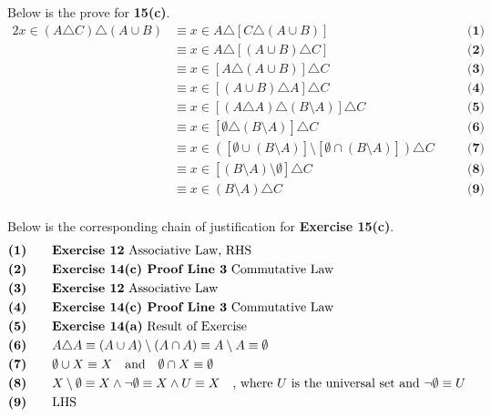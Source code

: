 Below is the prove for  \textbf{15(c)}.
\begin{alignat*}{2}
x \in (A \triangle C) \triangle (A \cup B) &\equiv x \in A \triangle [C \triangle (A \cup B)] && \quad \textbf{(1)}\\
&\equiv x \in A \triangle [(A \cup B) \triangle C] && \quad \textbf{(2)}\\
&\equiv x \in [A \triangle (A \cup B)] \triangle C && \quad \textbf{(3)}\\
&\equiv x \in [(A \cup B) \triangle A] \triangle C && \quad \textbf{(4)}\\
&\equiv x \in [(A \triangle A) \triangle (B \setminus A)] \triangle C && \quad \textbf{(5)}\\
&\equiv x \in [\emptyset \triangle (B \setminus A)] \triangle C && \quad \textbf{(6)}\\
&\equiv x \in ([\emptyset \cup (B \setminus A)] \setminus [\emptyset \cap (B \setminus A)] ) \triangle C && \quad \textbf{(7)}\\
&\equiv x \in [(B \setminus A) \setminus \emptyset] \triangle C && \quad \textbf{(8)}\\
&\equiv x \in (B \setminus A) \triangle C && \quad \textbf{(9)}\\
\end{alignat*}

Below is the corresponding chain of justification for \textbf{Exercise 15(c)}.
\begin{alignat*}{2}
&\textbf{(1)} && \quad \text{\textbf{Exercise 12} Associative Law, RHS}\\
&\textbf{(2)} && \quad \text{\textbf{Exercise 14(c) Proof Line 3} Commutative Law}\\
&\textbf{(3)} && \quad \text{\textbf{Exercise 12} Associative Law}\\
&\textbf{(4)} && \quad \text{\textbf{Exercise 14(c) Proof Line 3} Commutative Law}\\
&\textbf{(5)} && \quad \text{\textbf{Exercise 14(a)} Result of Exercise}\\
&\textbf{(6)} && \quad A \triangle A \equiv (A \cup A) \setminus (A \cap A) \equiv A \setminus A \equiv \emptyset\\
&\textbf{(7)} && \quad \emptyset \cup X \equiv X \quad \text{and} \quad \emptyset \cap X \equiv \emptyset\\
&\textbf{(8)} && \quad X \setminus \emptyset \equiv X \wedge \neg \emptyset \equiv X \wedge U \equiv X \quad \text{, where $U$ is the universal set and $\neg \emptyset \equiv U$}\\
&\textbf{(9)} && \quad \text{LHS}\\
\end{alignat*}